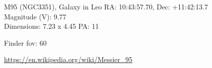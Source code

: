 \begin{block}{M95 (NGC3351), Galaxy in Leo}
    RA: 10:43:57.70, Dec: +11:42:13.7 \\ 
    Magnitude (V): 9.77 \\ 
    Dimensions: 7.23 x 4.45 PA: 11 

    Finder fov: 60 

    \url{https://en.wikipedia.org/wiki/Messier_95} 
\end{block}